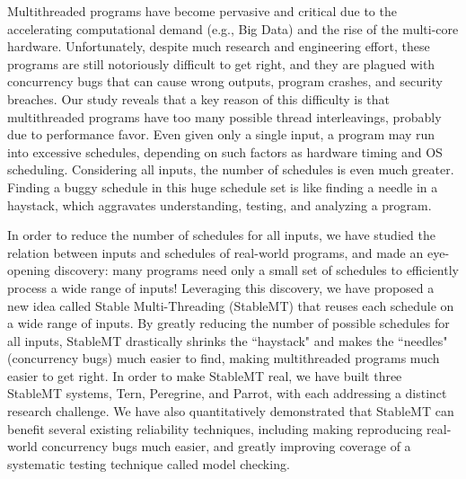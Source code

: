 Multithreaded programs have become pervasive and critical due to the accelerating computational demand (e.g., Big Data) and the rise of the multi-core hardware. Unfortunately, despite much research and engineering effort, these programs are still notoriously difficult to get right, and they are plagued with concurrency bugs that can cause wrong outputs, program crashes, and security breaches. Our study reveals that a key reason of this difficulty is that multithreaded programs have too many possible thread interleavings, probably due to performance favor. Even given only a single input, a program may run into excessive schedules, depending on such factors as hardware timing and OS scheduling. Considering all inputs, the number of schedules is even much greater. Finding a buggy schedule in this huge schedule set is like finding a needle in a haystack, which aggravates understanding, testing, and analyzing a program.

In order to reduce the number of schedules for all inputs, we have studied the relation between inputs and schedules of real-world programs, and made an eye-opening discovery: many programs need only a small set of schedules to efficiently process a wide range of inputs! Leveraging this discovery, we have proposed a new idea called Stable Multi-Threading (StableMT) that reuses each schedule on a wide range of inputs. By greatly reducing the number of possible schedules for all inputs, StableMT drastically shrinks the ``haystack" and makes the ``needles" (concurrency bugs) much easier to find, making multithreaded programs much easier to get right. In order to make StableMT real, we have built three StableMT systems, Tern, Peregrine, and Parrot, with each addressing a distinct research challenge. We have also quantitatively demonstrated that StableMT can benefit several existing reliability techniques, including making reproducing real-world concurrency bugs much easier, and greatly improving coverage of a systematic testing technique called model checking.

